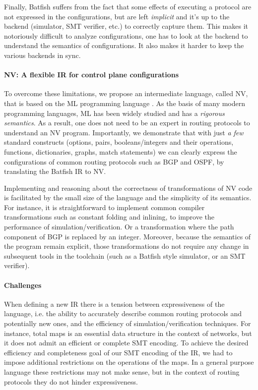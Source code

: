 \documentclass[sigconf,10pt]{acmart}
\begin{document}
Finally, Batfish suffers from the fact that some effects of executing
a protocol are not expressed in the configurations, but are left
\emph{implicit} and it's up to the backend (simulator, SMT verifier,
etc.) to correctly capture them. This makes it notoriously difficult
to analyze configurations, one has to look at the backend to
understand the semantics of configurations. It also makes it harder to
keep the various backends in sync.

\paragraph{NV: A flexible IR for control plane configurations}

To overcome these limitations, we propose an intermediate language,
called NV, that is based on the ML programming language
\cite{milner1978theory}. As the basis of many modern programming
languages, ML has been widely studied and has a \emph{rigorous
  semantics}. As a result, one does not need to be an expert in
routing protocols to understand an NV program. Importantly, we
demonstrate that with just \emph{a few} standard constructs (options,
pairs, booleans/integers and their operations, functions,
dictionaries, graphs, match statements) we can clearly express the
configurations of common routing protocols such as BGP and OSPF, by
translating the Batfish IR to NV.

Implementing and reasoning about the correctness of transformations of
NV code is facilitated by the small size of the language and the
simplicity of its semantics. For instance, it is straightforward to
implement common compiler transformations such as constant folding and
inlining, to improve the performance of simulation/verification. Or a
transformation where the path component of BGP is replaced by an
integer. Moreover, because the semantics of the program remain
explicit, those transformations do not require any change in
subsequent tools in the toolchain (such as a Batfish style simulator,
or an SMT verifier).

\paragraph{Challenges}

When defining a new IR there is a tension between expressiveness of
the language, i.e. the ability to accurately describe common routing
protocols and potentially new ones, and the efficiency of
simulation/verification techniques. For instance, total maps is an
essential data structure in the context of networks, but it does not
admit an efficient or complete SMT encoding. To achieve the desired
efficiency and completeness goal of our SMT encoding of the IR, we had
to impose additional restrictions on the operations of the maps. In a
general purpose language these restrictions may not make sense, but in
the context of routing protocols they do not hinder expressiveness.
\end{document}
